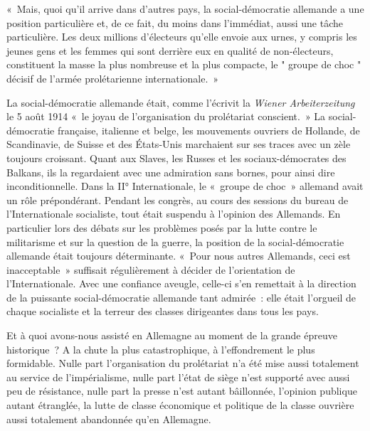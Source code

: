\documentclass[french,twoside]{book} %
\newenvironment{quoteblock}%
  {\begin{quoting}}
  {\end{quoting}}
\newenvironment{quotebar}{%
    \def\FrameCommand{{\color{rubric!10!}\vrule width 0.5em} \hspace{0.9em}}%
    \def\OuterFrameSep{\itemsep} %
    \MakeFramed {\advance\hsize-\width \FrameRestore}
  }%
  {%
    \endMakeFramed
  }
\renewenvironment{quoteblock}%
  {%
    \savenotes
    \setstretch{0.9}
    \normalfont
    \begin{quotebar}
  }
  {%
    \end{quotebar}
    \spewnotes
  }
\begin{document}
\begin{quoteblock}
 \noindent « Mais, quoi qu’il arrive dans d’autres pays, la social-démocratie allemande a une position particulière et, de ce fait, du moins dans l’immédiat, aussi une tâche particulière. Les deux millions d’électeurs qu’elle envoie aux urnes, y compris les jeunes gens et les femmes qui sont derrière eux en qualité de non-électeurs, constituent la masse la plus nombreuse et la plus compacte, le " groupe de choc " décisif de l’armée prolétarienne internationale. »
\end{quoteblock}

\noindent La social-démocratie allemande était, comme l’écrivit la \emph{Wiener Arbeiterzeitung} le 5 août 1914 « le joyau de l’organisation du prolétariat conscient. » La social-démocratie française, italienne et belge, les mouvements ouvriers de Hollande, de Scandinavie, de Suisse et des États-Unis marchaient sur ses traces avec un zèle toujours croissant. Quant aux Slaves, les Russes et les sociaux-démocrates des Balkans, ils la regardaient avec une admiration sans bornes, pour ainsi dire inconditionnelle. Dans la II° Internationale, le « groupe de choc » allemand avait un rôle prépondérant. Pendant les congrès, au cours des sessions du bureau de l’Internationale socialiste, tout était suspendu à l’opinion des Allemands. En particulier lors des débats sur les problèmes posés par la lutte contre le militarisme et sur la question de la guerre, la position de la social-démocratie allemande était toujours déterminante. « Pour nous autres Allemands, ceci est inacceptable » suffisait régulièrement à décider de l’orientation de l’Internationale. Avec une confiance aveugle, celle-ci s’en remettait à la direction de la puissante social-démocratie allemande tant admirée : elle était l’orgueil de chaque socialiste et la terreur des classes dirigeantes dans tous les pays.\par
Et à quoi avons-nous assisté en Allemagne au moment de la grande épreuve historique ? A la chute la plus catastrophique, à l’effondrement le plus formidable. Nulle part l’organisation du prolétariat n’a été mise aussi totalement au service de l’impérialisme, nulle part l’état de siège n’est supporté avec aussi peu de résistance, nulle part la presse n’est autant bâillonnée, l’opinion publique autant étranglée, la lutte de classe économique et politique de la classe ouvrière aussi totalement abandonnée qu’en Allemagne.\par
\end{document}
